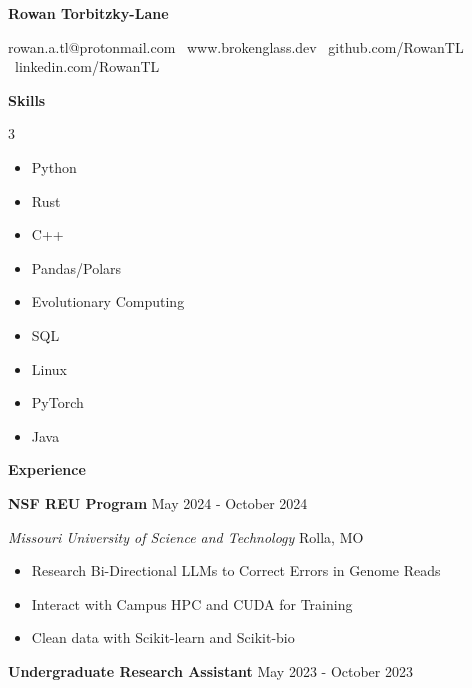 \documentclass[11pt]{article}
\begin{document}
\begin{center}
    \textbf{\huge Rowan Torbitzky-Lane}\\
    \hrulefill
\end{center}

\begin{center}
    rowan.a.tl@protonmail.com \textbullet \ www.brokenglass.dev \textbullet \ github.com/RowanTL \textbullet  \ linkedin.com/RowanTL
\end{center}


\begin{center}
    \textbf{Skills}
\end{center}

\begin{multicols}{3}
    \begin{itemize}[noitemsep, topsep=0pt, partopsep=0pt, parsep=0pt, itemsep=0pt]
        \item Python
        \item Rust
        \item C++
        \item Pandas/Polars
        \item Evolutionary Computing
        \item SQL
        \item Linux
        \item PyTorch
        \item Java
    \end{itemize}
\end{multicols}

\begin{center}
    \textbf{Experience}
\end{center}

\textbf{NSF REU Program} \hfill May 2024 - October 2024

\textsl{Missouri University of Science and Technology} \hfill Rolla, MO
\begin{itemize}[noitemsep, topsep=0pt, partopsep=0pt, parsep=0pt, itemsep=0pt]
    \item Research Bi-Directional LLMs to Correct Errors in Genome Reads
    \item Interact with Campus HPC and CUDA for Training
    \item Clean data with Scikit-learn and Scikit-bio
\end{itemize}


\textbf{Undergraduate Research Assistant} \hfill May 2023 - October 2023
\end{document}
